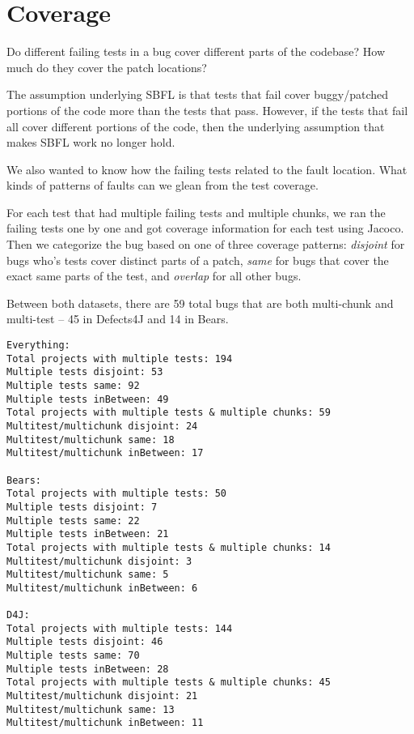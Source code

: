 \section{Coverage}


Do different failing tests in a bug cover different parts of the codebase? How much do they cover the patch locations?

The assumption underlying SBFL is that tests that fail cover buggy/patched portions of the code more than the tests that pass. However, if the tests that fail all cover different portions of the code, then the underlying assumption that makes SBFL work no longer hold.

We also wanted to know how the failing tests related to the fault location. What kinds of patterns of faults can we glean from the test coverage.

For each test that had multiple failing tests and multiple chunks, we ran the failing tests one by one and got coverage information for each test using Jacoco. Then we categorize the bug based on one of three coverage patterns: \textit{disjoint} for bugs who's tests cover distinct parts of a patch, \textit{same} for bugs that cover the exact same parts of the test, and \textit{overlap} for all other bugs.

Between both datasets, there are 59 total bugs that are both multi-chunk and multi-test -- 45 in Defects4J and 14 in Bears.

\begin{lstlisting}
Everything:
Total projects with multiple tests: 194
Multiple tests disjoint: 53
Multiple tests same: 92
Multiple tests inBetween: 49
Total projects with multiple tests & multiple chunks: 59
Multitest/multichunk disjoint: 24
Multitest/multichunk same: 18
Multitest/multichunk inBetween: 17

Bears:
Total projects with multiple tests: 50
Multiple tests disjoint: 7
Multiple tests same: 22
Multiple tests inBetween: 21
Total projects with multiple tests & multiple chunks: 14
Multitest/multichunk disjoint: 3
Multitest/multichunk same: 5
Multitest/multichunk inBetween: 6

D4J:
Total projects with multiple tests: 144
Multiple tests disjoint: 46
Multiple tests same: 70
Multiple tests inBetween: 28
Total projects with multiple tests & multiple chunks: 45
Multitest/multichunk disjoint: 21
Multitest/multichunk same: 13
Multitest/multichunk inBetween: 11
\end{lstlisting}


